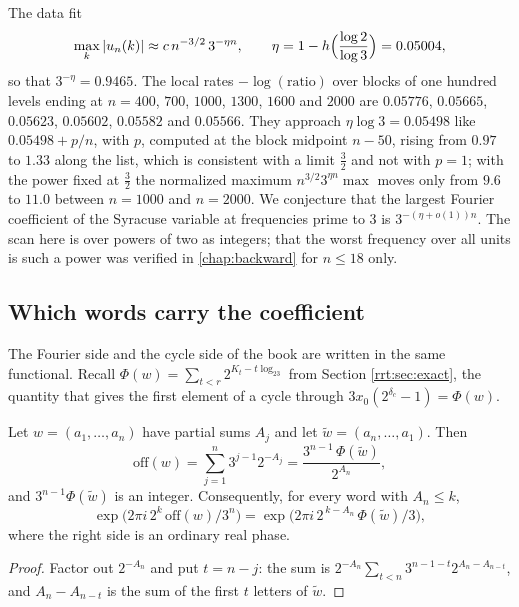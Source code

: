\begin{remark}[Conjecture]\label{rrt:conj:fourier}
The data fit
\[
\max_k|u_n(k)|\approx c\,n^{-3/2}\,3^{-\eta n},\qquad\eta=1-h\Bigl(\frac{\log2}{\log3}\Bigr)=0.05004,
\]
so that $3^{-\eta}=0.9465$. The local rates $-\log(\text{ratio})$ over blocks of one hundred levels ending at $n=400$, $700$, $1000$, $1300$, $1600$ and $2000$ are $0.05776$, $0.05665$, $0.05623$, $0.05602$, $0.05582$ and $0.05566$. They approach $\eta\log3=0.05498$ like $0.05498+p/n$, with $p$, computed at the block midpoint $n-50$, rising from $0.97$ to $1.33$ along the list, which is consistent with a limit $\tfrac32$ and not with $p=1$; with the power fixed at $\tfrac32$ the normalized maximum $n^{3/2}3^{\eta n}\max$ moves only from $9.6$ to $11.0$ between $n=1000$ and $n=2000$. We conjecture that the largest Fourier coefficient of the Syracuse variable at frequencies prime to $3$ is $3^{-(\eta+o(1))n}$. The scan here is over powers of two as integers; that the worst frequency over all units is such a power was verified in \cref{chap:backward} for $n\le18$ only.
\end{remark}

\subsection{Which words carry the coefficient}
The Fourier side and the cycle side of the book are written in the same functional. Recall $\Phi(w)=\sum_{t<r}2^{K_t-t\log_23}$ from Section \ref{rrt:sec:exact}, the quantity that gives the first element of a cycle through $3x_0(2^{\delta_c}-1)=\Phi(w)$.

\begin{proposition}\label{rrt:prop:phi}
Let $w=(a_1,\dots,a_n)$ have partial sums $A_j$ and let $\tilde w=(a_n,\dots,a_1)$. Then
\[
\mathrm{off}(w)=\sum_{j=1}^n3^{j-1}2^{-A_j}=\frac{3^{n-1}\,\Phi(\tilde w)}{2^{A_n}},
\]
and $3^{n-1}\Phi(\tilde w)$ is an integer. Consequently, for every word with $A_n\le k$,
\[
\exp\bigl(2\pi i\,2^k\,\mathrm{off}(w)/3^n\bigr)=\exp\bigl(2\pi i\,2^{\,k-A_n}\,\Phi(\tilde w)/3\bigr),
\]
where the right side is an ordinary real phase.
\end{proposition}

\begin{proof}
Factor out $2^{-A_n}$ and put $t=n-j$: the sum is $2^{-A_n}\sum_{t<n}3^{n-1-t}2^{A_n-A_{n-t}}$, and $A_n-A_{n-t}$ is the sum of the first $t$ letters of $\tilde w$.
\end{proof}

